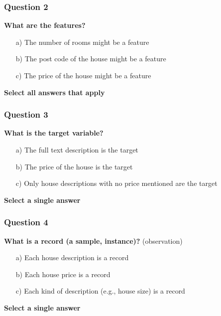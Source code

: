 \documentclass{beamer}
\begin{document}
\begin{frame}
	\frametitle{Question 2}
	
	\textbf{What are the features?}
	
	\begin{enumerate}
		\item[a)] The number of rooms might be a feature
		\item[b)] The post code of the house might be a feature
		\item[c)] The price of the house might be a feature
	\end{enumerate}
	
	\vspace{0.5cm}
	
	\textbf{Select all answers that apply}
	
\end{frame}

\begin{frame}
	\frametitle{Question 3}
	
	\textbf{What is the target variable?}
	
	\begin{enumerate}
		\item[a)] The full text description is the target
		\item[b)] The price of the house is the target
		\item[c)] Only house descriptions with no price mentioned are the target
	\end{enumerate}
	
	\vspace{0.5cm}
	
	\textbf{Select a single answer}
	
\end{frame}

\begin{frame}
	\frametitle{Question 4}
	
	\textbf{What is a record (a sample, instance)?} (observation)
	
	\begin{enumerate}
		\item[a)] Each house description is a record
		\item[b)] Each house price is a record
		\item[c)] Each kind of description (e.g., house size) is a record
	\end{enumerate}
	
	\vspace{0.5cm}
	
	\textbf{Select a single answer}
	
\end{frame}
	
\end{document}
